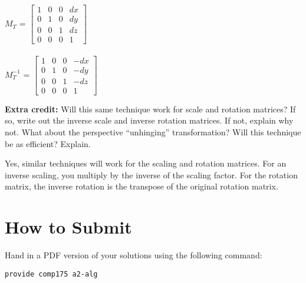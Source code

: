 \documentclass[10pt,twocolumn]{article}
\begin{document}
\begin{framed}
    $M_T$ = $\begin{bmatrix}
        1 & 0 & 0 & dx \\
        0 & 1 & 0 & dy \\
        0 & 0 & 1 & dz \\
        0 & 0 & 0 & 1
    \end{bmatrix}$\\\\
    $M_T^{-1}$ = $\begin{bmatrix}
        1 & 0 & 0 & -dx \\
        0 & 1 & 0 & -dy \\
        0 & 0 & 1 & -dz \\
        0 & 0 & 0 & 1
    \end{bmatrix}$
\end{framed}


{\bf Extra credit:} Will this same technique work for scale and rotation matrices? If so, write out the inverse scale and inverse rotation matrices. If not, explain why not. What about the perspective ``unhinging'' transformation? Will this technique be as efficient? Explain.

\begin{framed}
    Yes, similar techniques will work for the scaling and rotation matrices. For an inverse scaling, you multiply by the inverse of the scaling factor. For the rotation matrix, the inverse rotation is the transpose of the original rotation matrix.\\

\end{framed}

\section{How to Submit}

Hand in a PDF version of your solutions using the following command:
\begin{center}
 {\tt provide comp175 a2-alg}
 \end{center}
\end{document}
